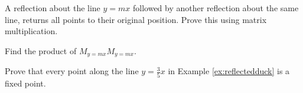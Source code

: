 \documentclass{ximera}
\begin{document}
\begin{problem}\label{prob:reflectreflect} A reflection about the line $y=mx$ followed by another reflection about the same line, returns all points to their original position.  Prove this using matrix multiplication.
\begin{hint}
    Find the product of $M_{y=mx}M_{y=mx}$.
\end{hint}
\end{problem}


\begin{problem}\label{prob:fixedpoint}
Prove that every point along the line $y=\frac{3}{5}x$ in Example \ref{ex:reflectedduck} is a fixed point.
\end{problem}
\end{document}
